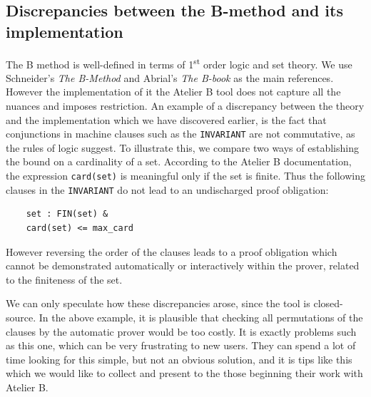 \documentclass[11pt,journal]{IEEEtran}
\begin{document}
	\subsection{Discrepancies between the B-method and its implementation}
	The B method is well-defined in terms of 1\textsuperscript{st} order logic and set theory. We use Schneider's \emph{The B-Method}\cite{b-method} and Abrial's \emph{The B-book}\cite{b-book} as the main references. However the implementation of it the Atelier B tool does not capture all the nuances and imposes restriction. An example of a discrepancy between the theory and the implementation which we have discovered earlier, is the fact that conjunctions in machine clauses such as the \texttt{INVARIANT} are not commutative, as the rules of logic suggest. To illustrate this, we compare two ways of establishing the bound on a cardinality of a set. According to the Atelier B documentation, the expression \texttt{card(set)} is meaningful only if the set is finite. Thus the following clauses in the \texttt{INVARIANT} do not lead to an undischarged proof obligation:
	
	\begin{lstlisting}
	set : FIN(set) & 
	card(set) <= max_card 
	\end{lstlisting}
	
	However reversing the order of the clauses leads to a proof obligation which cannot be demonstrated automatically or interactively within the prover, related to the finiteness of the set. 
	
	We can only speculate how these discrepancies arose, since the tool is closed-source. In the above example, it is plausible that checking all permutations of the clauses by the automatic prover would be too costly. It is exactly problems such as this one, which can be very frustrating to new users. They can spend a lot of time looking for this simple, but not an obvious solution, and it is tips like this which we would like to collect and present to the those beginning their work with Atelier B.
	
\end{document}
